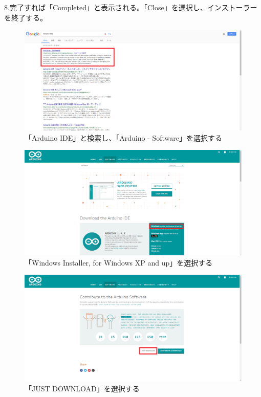 \documentclass[uplatex]{jsarticle}
\begin{document}
8.完了すれば「Completed」と表示される。「Close」を選択し、インストーラーを終了する。
\begin{figure}
    \centering
    \includegraphics[width=13cm]{found_arduino}
    \caption{「Arduino IDE」と検索し、「Arduino - Software」を選択する}
\end{figure}
\begin{figure}
    \centering
    \includegraphics[width=13cm]{download_1.png}
    \caption{「Windows Installer, for Windows XP and up」を選択する}
\end{figure}
\begin{figure}
    \centering
    \includegraphics[width=13cm]{download_2.png}
    \caption{「JUST DOWNLOAD」を選択する}
\end{figure}
\end{document}
